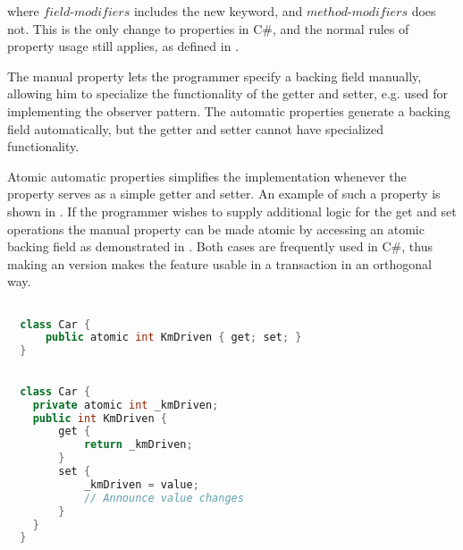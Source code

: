 where $field$-$modifiers$ includes the new  keyword, and $method$-$modifiers$ does not. This is the only change to properties in C\#, and the normal rules of property usage still applies, as defined in \cite[p. 52]{sestoft2011c}.

The manual property lets the programmer specify a backing field manually, allowing him to specialize the functionality of the getter and setter, e.g. used for implementing the observer pattern. The automatic properties generate a backing field automatically, but the getter and setter cannot have specialized functionality. 

Atomic automatic properties simplifies the implementation whenever the property serves as a simple getter and setter. An example of such a property is shown in . If the programmer wishes to supply additional logic for the get and set operations the manual property can be made atomic by accessing an atomic backing field as demonstrated in . Both cases are frequently used in C\#, thus making an  version makes the feature usable in a transaction in an orthogonal way.

\begin{lstlisting}[label=lst:auto_atomic_property,
  caption={Automatic Transactional Properties},
  language=Java,  
  showspaces=false,
  showtabs=false,
  breaklines=true,
  showstringspaces=false,
  breakatwhitespace=true,
  commentstyle=\color{greencomments},
  keywordstyle=\color{bluekeywords},
  stringstyle=\color{redstrings},
  morekeywords={atomic, retry, orElse, var, get, set}]  % Start your code-block

  class Car {
      public atomic int KmDriven { get; set; }
  }
\end{lstlisting}

\begin{lstlisting}[label=lst:atomic_property,
  caption={Manual Transactional Property},
  language=Java,  
  showspaces=false,
  showtabs=false,
  breaklines=true,
  showstringspaces=false,
  breakatwhitespace=true,
  commentstyle=\color{greencomments},
  keywordstyle=\color{bluekeywords},
  stringstyle=\color{redstrings},
  morekeywords={atomic, retry, orElse, var, get, set}]  % Start your code-block

  class Car {
    private atomic int _kmDriven;
    public int KmDriven {
        get {
            return _kmDriven;
        }
        set {
            _kmDriven = value;
            // Announce value changes
        }
    }
  }
\end{lstlisting}


